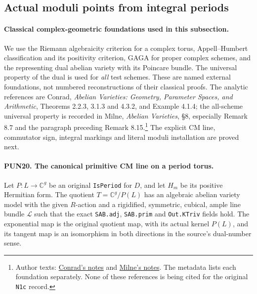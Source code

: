 \documentclass[11pt,a4paper]{article}
\numberwithin{equation}{section}
\theoremstyle{remark}\newtheorem{remark}[theorem]{Remark}
\begin{document}
\subsection{Actual moduli points from integral periods}

\paragraph{Classical complex-geometric foundations used in this subsection.}
We use the Riemann algebraicity criterion for a complex torus,
Appell--Humbert classification and its positivity criterion,
GAGA for proper complex schemes, and the representing dual abelian variety with its
Poincare bundle.  The universal property of the dual is used for
\emph{all} test schemes.  These are named external foundations,
not numbered reconstructions of their classical proofs.
The analytic references are Conrad, \emph{Abelian Varieties:
Geometry, Parameter Spaces, and Arithmetic}, Theorems 2.2.3,
3.1.3 and 4.3.2, and Example 4.1.4; the all-scheme universal
property is recorded in Milne, \emph{Abelian Varieties},
\S8, especially Remark 8.7 and the paragraph preceding
Remark 8.15.\footnote{Author texts:
\href{https://math.stanford.edu/~conrad/papers/cmchina.pdf}{Conrad's notes}
and \href{https://www.jmilne.org/math/CourseNotes/AV.pdf}{Milne's notes}.
The metadata lists each foundation separately.  None of these
references is being cited for the original \texttt{N1c} record.}
The explicit CM line, commutator sign, integral markings and
literal moduli installation are proved next.

\paragraph{PUN20. The canonical primitive CM line on a period torus.}
\label{claim:PUN20}
Let \(P:L\to\mathbb C^g\) be an original \texttt{Is\allowbreak Period}
for \(D\), and let \(H_m\) be its positive Hermitian form.
The quotient \(T=\mathbb C^g/P(L)\) has an algebraic abelian
variety model with the given \(R\)-action and a rigidified,
symmetric, cubical, ample line bundle \(\mathcal L\) such that
the exact \texttt{SAB.\allowbreak adj}, \texttt{SAB.\allowbreak prim} and
\texttt{Out.\allowbreak KTriv} fields hold.  The exponential map is the
original quotient map, with its actual kernel \(P(L)\), and
its tangent map is an isomorphism in both directions in the
source's dual-number sense.
\end{document}

